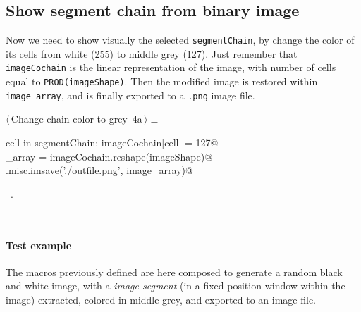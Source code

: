 \documentclass[11pt,oneside]{article}	%
\begin{document}
\subsection{Show segment chain from binary image}

Now we need to show visually the selected \texttt{segmentChain}, by change the color of its cells from white (255) to middle grey (127). Just remember that \texttt{imageCochain} is the linear representation of the image, with number of cells equal to \texttt{PROD(imageShape)}. Then the modified image is restored within \texttt{image\_array}, and is finally exported to a \texttt{.png} image file.

\begin{flushleft} \small
\begin{minipage}{\linewidth} \label{scrap5}
\protect{}$\langle\,$Change chain color to grey\nobreak\ {\footnotesize 4a}$\,\rangle\equiv$
\vspace{-1ex}
\begin{list}{}{} \item
\mbox{}\verb@for cell in segmentChain: imageCochain[cell] = 127@\\
\mbox{}\verb@image_array = imageCochain.reshape(imageShape)@\\
\mbox{}\verb@scipy.misc.imsave('./outfile.png', image_array)@\\
\mbox{}\verb@@{\NWsep}
\end{list}
\vspace{-1ex}
\footnotesize\addtolength{\baselineskip}{-1ex}
\begin{list}{}{\setlength{\itemsep}{-\parsep}\setlength{\itemindent}{-\leftmargin}}
\item \NWtxtMacroRefIn\ .
\end{list}
\end{minipage}\\[4ex]
\end{flushleft}


\paragraph{Test example}

The macros previously defined are here composed to generate a random black and white image, with a \emph{image segment} (in a fixed position window within the image) extracted, colored in middle grey, and exported to an image file.  
\end{document}
